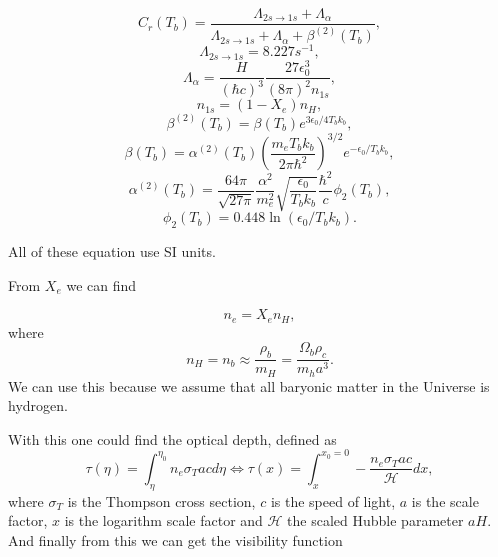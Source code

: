 \documentclass[a4paper,norsk, 10pt]{article}
\begin{document}
\begin{equation}
C_r (T_b) = \frac{\Lambda_{2s \rightarrow 1s}+ \Lambda_{\alpha}}{\Lambda_{2s \rightarrow 1s} + \Lambda_{\alpha} + \beta^{(2)}(T_b)},
\end{equation}
\begin{equation}
\Lambda_{2s\rightarrow 1s} = 8.227 s^{-1},
\end{equation}
\begin{equation}
\Lambda_{\alpha} = \frac{H}{(\hbar c)^3}\frac{27\epsilon_0^3}{(8\pi)^2 n_{1s}},
\end{equation}
\begin{equation}
n_{1s} = (1-X_e)n_{H},
\end{equation}
\begin{equation}\label{eq:beta2}
\beta^{(2)}(T_b) = \beta(T_b)e^{3\epsilon_0/4T_bk_b},
\end{equation}
\begin{equation}\label{eq:beta}
\beta(T_b) = \alpha^{(2)}(T_b)\left(\frac{m_eT_b k_b}{2\pi \hbar^2}\right)^{3/2}e^{-\epsilon_0/T_bk_b},
\end{equation}
\begin{equation}
\alpha^{(2)}(T_b) = \frac{64\pi}{\sqrt{27\pi}}\frac{\alpha^2}{m_e^2}\sqrt{\frac{\epsilon_0}{T_bk_b}}\frac{\hbar^2}{c}\phi_{2}(T_b),
\end{equation}
\begin{equation}
\phi_{2}(T_b) = 0.448\ln(\epsilon_0/T_bk_b).
\end{equation}

All of these equation use SI units. 

From $X_e$ we can find

\begin{equation}\label{eq:n_e}
n_e = X_e n_H,
\end{equation}
where
\begin{equation}
n_H = n_b \approx \frac{\rho_b}{m_H} = \frac{\Omega_b \rho_c}{m_h a^3}.
\end{equation}
We can use this because we assume that all baryonic matter in the Universe is hydrogen.

With this one could find the optical depth, defined as 
\begin{equation}\label{eq:tau}
\tau(\eta) = \int_{\eta}^{\eta_0} n_e \sigma_T a c d\eta \Leftrightarrow \tau(x) = \int_x^{x_0 = 0} - \frac{n_e \sigma_T a c}{\mathcal{H}} dx,
\end{equation}
where $\sigma_T$ is the Thompson cross section, $c$ is the speed of light, $a$ is the scale factor, $x$ is the logarithm scale factor and $\mathcal{H}$ the scaled Hubble parameter $aH$. And finally from this we can get the visibility function
\end{document}
